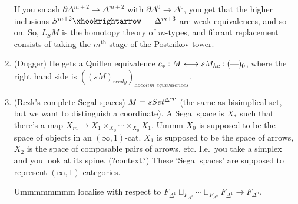 \documentclass[11pt]{article}
\begin{document}
\begin{AlexandreBausfieldLocalisation}
\begin{PartTwo}
\begin{enumerate}
If you smash $\partial\Delta^{m+2}\to \Delta^{m+2}$ with $\partial\Delta^0\to\Delta^0$, you get that the higher inclusions $S^{m+2}\cofibration \Delta^{m+3}$ are weak equivalences, and so on. So, $L_SM$ is the homotopy theory of $m$-types, and fibrant replacement consists of taking the $m^\text{th}$ stage of the Postnikov tower.
\item (Dugger) He gets a Quillen equivalence $c_*:M\longleftrightarrow sM_{hc}:(\textup{---})_0$, where the right hand side is $((sM)_{reedy})_{\textit{hocolim equivalences}}$.
\item (Rezk's complete Segal spaces) $M=sSet^{\Delta^{\textup{op}}}$ (the same as bisimplical set, but we want to distinguish a coordinate). A Segal space is $X_*$ such that there's a map $X_m\to X_1\times_{X_0}\cdots\times_{X_0}X_1$. Ummm $X_0$ is supposed to be the space of objects in an $(\infty,1)$-cat. $X_1$ is supposed to be the space of arrows, $X_2$ is the space of composable pairs of arrows, etc. I.e.\ you take a simplex and you look at its spine. (?context?) These `Segal spaces' are supposed to represent $(\infty,1)$-categories.

Ummmmmmmm localise with respect to $F_{\Delta^1}\sqcup_{F_{\Delta^0}}\cdots\sqcup_{F_{\Delta^0}}F_{\Delta^1}\to F_{\Delta^n}$.
\end{enumerate}
\end{PartTwo}
\pagebreak
\end{AlexandreBausfieldLocalisation}
\end{document}
